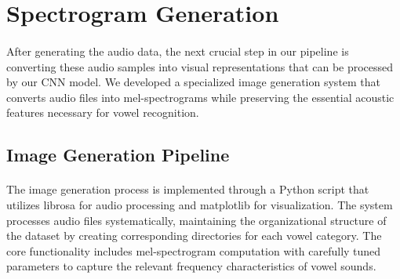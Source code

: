 \section{Spectrogram Generation}
\label{sec:spectrogram-generation}

\paragraph{}
After generating the audio data, the next crucial step in our pipeline is converting these audio samples into visual representations that can be processed by our CNN model. We developed a specialized image generation system that converts audio files into mel-spectrograms while preserving the essential acoustic features necessary for vowel recognition.

\subsection{Image Generation Pipeline}
\label{subsec:image-generation-pipeline}

\paragraph{}
The image generation process is implemented through a Python script that utilizes librosa for audio processing and matplotlib for visualization. The system processes audio files systematically, maintaining the organizational structure of the dataset by creating corresponding directories for each vowel category. The core functionality includes mel-spectrogram computation with carefully tuned parameters to capture the relevant frequency characteristics of vowel sounds.

